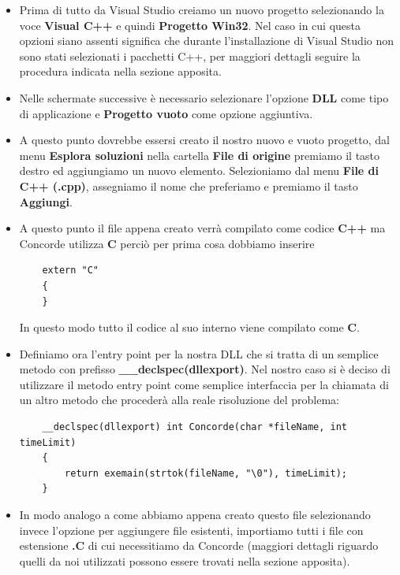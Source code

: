 \documentclass[11pt]{article}
\begin{document}
\begin{itemize}
    
    \item Prima di tutto da Visual Studio creiamo un nuovo progetto selezionando la voce \textbf{Visual C++} e quindi \textbf{Progetto Win32}. Nel caso in cui questa opzioni siano assenti significa che durante l'installazione di Visual Studio non sono stati selezionati i pacchetti C++, per maggiori dettagli seguire la procedura indicata nella sezione apposita.
    
    \item Nelle schermate successive è necessario selezionare l'opzione \textbf{DLL} come tipo di applicazione e \textbf{Progetto vuoto} come opzione aggiuntiva.
    
    \item A questo punto dovrebbe essersi creato il nostro nuovo e vuoto progetto, dal menu \textbf{Esplora soluzioni} nella cartella \textbf{File di origine} premiamo il tasto destro ed aggiungiamo un nuovo elemento. Selezioniamo dal menu \textbf{File di C++ (.cpp)}, assegniamo il nome che preferiamo e premiamo il tasto \textbf{Aggiungi}.
    
    \item A questo punto il file appena creato verrà compilato come codice \textbf{C++} ma Concorde utilizza \textbf{C} perciò per prima cosa dobbiamo inserire 
    \begin{lstlisting}
    extern "C"
    {
    }
    \end{lstlisting}
    In questo modo tutto il codice al suo interno viene compilato come \textbf{C}.
    
    \item Definiamo ora l'entry point per la nostra DLL che si tratta di un semplice metodo con prefisso \textbf{\_\_declspec(dllexport)}. Nel nostro caso si è deciso di utilizzare il metodo entry point come semplice interfaccia per la chiamata di un altro metodo che procederà alla reale risoluzione del problema:
    \begin{lstlisting}
    __declspec(dllexport) int Concorde(char *fileName, int timeLimit)
    {
        return exemain(strtok(fileName, "\0"), timeLimit);
    }
    \end{lstlisting}
    
    \item In modo analogo a come abbiamo appena creato questo file selezionando invece l'opzione per aggiungere file esistenti, importiamo tutti i file con estensione \textbf{.C} di cui necessitiamo da Concorde (maggiori dettagli riguardo quelli da noi utilizzati possono essere trovati nella sezione apposita).
    

\end{itemize}
\end{document}
